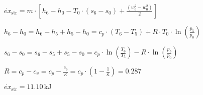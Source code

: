 \( \dot{ex}_{\text{str}} = m \cdot \left[ h_6 - h_0 - T_0 \cdot (s_6 - s_0) + \frac{(w_6^2 - w_0^2)}{2} \right] \)  

\( h_6 - h_0 = h_6 - h_5 + h_5 - h_0 = c_p \cdot (T_6 - T_5) + R \cdot T_0 \cdot \ln \left( \frac{p_5}{p_0} \right) \)  

\( s_6 - s_0 = s_6 - s_5 + s_5 - s_0 = c_p \cdot \ln \left( \frac{T_6}{T_5} \right) - R \cdot \ln \left( \frac{p_5}{p_0} \right) \)  

\( R = c_p - c_v = c_p - \frac{c_p}{\kappa} = c_p \cdot \left( 1 - \frac{1}{\kappa} \right) = 0.287 \)  

\( \dot{ex}_{\text{str}} = 11.10 \, \text{kJ} \)